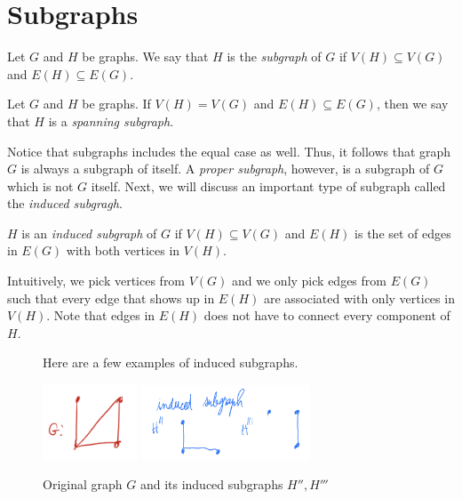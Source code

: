 \section{Subgraphs}

\begin{definition}[Subgraph]
  Let \(G\) and \(H\) be graphs. We say that \(H\) is the \textit{subgraph} of
  \(G\) if \(V(H) \subseteq V(G)\) and \(E(H) \subseteq E(G)\).
\end{definition}

\begin{definition}
  Let \(G\) and \(H\) be graphs. If \(V(H) = V(G)\) and \(E(H) \subseteq E(G)\), then we say that \(H\) is a \textit{spanning subgraph}.
\end{definition}

Notice that subgraphs includes the equal case as well. Thus, it follows that graph \(G\) is always a subgraph of itself. A \textit{proper subgraph},
however, is a subgraph of \(G\) which is not \(G\) itself. Next, we will discuss
an important type of
subgraph called the \textit{induced subgragh}.

\begin{definition}
  \(H\) is an \textit{induced subgraph} of \(G\) if \(V(H) \subseteq V(G)\) and \(E(H)\)
  is the set of edges in \(E(G)\) with both vertices in \(V(H)\). 

  Intuitively, we pick vertices from \(V(G)\) and we only pick edges from
  \(E(G)\) such that every edge that shows up in \(E(H)\) are associated with
  only vertices in \(V(H)\). Note that edges in \(E(H)\) does not have to
  connect every component of \(H\).
\end{definition}

\begin{figure}[ht]
\begin{nexample}
  Here are a few examples of induced subgraphs.

  \begin{center}
    \includegraphics[width=0.25\textwidth]{figures/l01/induced-original}
    \includegraphics[width=0.45\textwidth]{figures/l01/induced-subgraph}
    \caption{Original graph \(G\) and its induced subgraphs \(H'', H'''\)}\label{fig:induced-subgraph}
  \end{center}
\end{nexample}
\end{figure}


